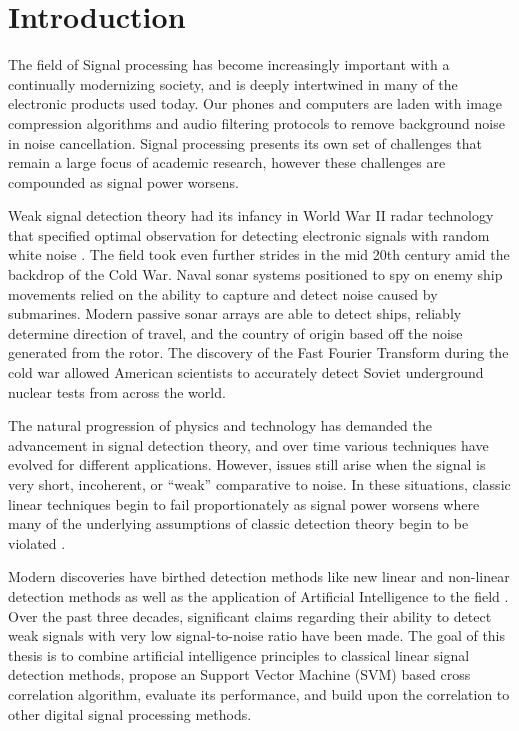\chapter{Introduction} \label{ch:introduction}
    The field of Signal processing has become increasingly important with a continually modernizing society, and is deeply intertwined in many of the electronic products used today. Our phones and computers are laden with image compression algorithms and audio filtering protocols to remove background noise in noise cancellation. Signal processing presents its own set of challenges that remain a large focus of academic research, however these challenges are compounded as signal power worsens. 
    
    Weak signal detection theory had its infancy in World War II radar technology that specified optimal observation for detecting electronic signals with random white noise \cite{swets_history_2001}. The field took even further strides in the mid 20th century amid the backdrop of the Cold War. Naval sonar systems positioned to spy on enemy ship movements relied on the ability to capture and detect noise caused by submarines. Modern passive sonar arrays are able to detect ships, reliably determine direction of travel, and the country of origin based off the noise generated from the rotor. The discovery of the Fast Fourier Transform during the cold war allowed American scientists to accurately detect Soviet underground nuclear tests from across the world. 
    
    The natural progression of physics and technology has demanded the advancement in signal detection theory, and over time various techniques have evolved for different applications. However, issues still arise when the signal is very short, incoherent, or “weak” comparative to noise. In these situations, classic linear techniques begin to fail proportionately as signal power worsens where many of the underlying assumptions of classic detection theory begin to be violated \cite{deeks_nonlinear_2017}.
    
    Modern discoveries have birthed detection methods like new linear and non-linear detection methods as well as the application of Artificial Intelligence to the field \cite{wang_current_2013} \cite{li-xin_weak_2008}. Over the past three decades, significant claims regarding their ability to detect weak signals with very low signal-to-noise ratio have been made. The goal of this thesis is to combine artificial intelligence principles to classical linear signal detection methods, propose an Support Vector Machine (SVM) based cross correlation algorithm, evaluate its performance, and build upon the correlation to other digital signal processing methods.

